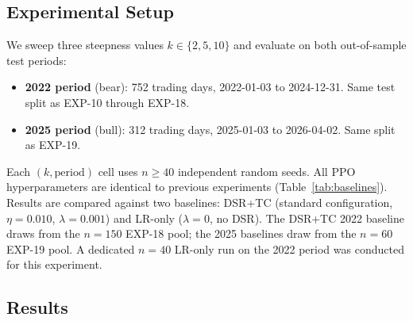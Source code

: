 \documentclass[conference]{IEEEtran}
\begin{document}
\subsection{Experimental Setup}
\label{sec:rsmo_setup}

We sweep three steepness values $k \in \{2, 5, 10\}$ and evaluate on
both out-of-sample test periods:
\begin{itemize}
  \item \textbf{2022 period} (bear): 752 trading days, 2022-01-03 to
    2024-12-31. Same test split as EXP-10 through EXP-18.
  \item \textbf{2025 period} (bull): 312 trading days, 2025-01-03 to
    2026-04-02. Same split as EXP-19.
\end{itemize}
Each $(k, \text{period})$ cell uses $n \geq 40$ independent random
seeds.
All PPO hyperparameters are identical to previous experiments
(Table~\ref{tab:baselines}). Results are compared against two baselines:
DSR+TC (standard configuration, $\eta=0.010$, $\lambda=0.001$) and
LR-only ($\lambda=0$, no DSR). The DSR+TC 2022 baseline draws from the
$n=150$ EXP-18 pool; the 2025 baselines draw from the $n=60$ EXP-19
pool. A dedicated $n=40$ LR-only run on the 2022 period was conducted
for this experiment.

\subsection{Results}
\label{sec:rsmo_results}

\begin{table}[t]
\caption{EXP-20: RSMO vs Baselines (Annualised Sharpe Ratio, mean $\pm$ std)}
\label{tab:rsmo}
\centering
{}
\end{table}
\end{document}
